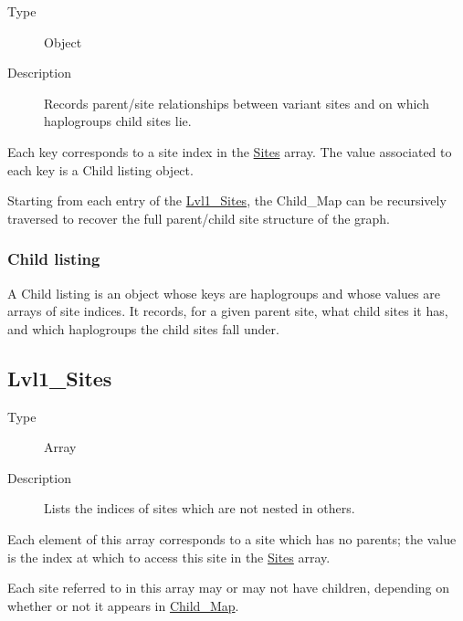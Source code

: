 \begin{description}
\item[Type]
Object
\item[Description]
Records parent/site relationships between variant sites and on which
haplogroups child sites lie.
\end{description}

Each key corresponds to a site index in the
\protect\hyperlink{sites}{Sites} array. The value associated to each key
is a Child listing object.

Starting from each entry of the
\protect\hyperlink{lvl1_sites}{Lvl1\_Sites}, the Child\_Map can be
recursively traversed to recover the full parent/child site structure of
the graph.

\hypertarget{child-listing}{%
\subsubsection{Child listing}\label{child-listing}}

A Child listing is an object whose keys are haplogroups and whose values
are arrays of site indices. It records, for a given parent site, what
child sites it has, and which haplogroups the child sites fall under.

\hypertarget{lvl1_sites}{%
\subsection{Lvl1\_Sites}\label{lvl1_sites}}

\begin{description}
\item[Type]
Array
\item[Description]
Lists the indices of sites which are not nested in others.
\end{description}

Each element of this array corresponds to a site which has no parents;
the value is the index at which to access this site in the
\protect\hyperlink{sites}{Sites} array.

Each site referred to in this array may or may not have children,
depending on whether or not it appears in
\protect\hyperlink{child_map}{Child\_Map}.
